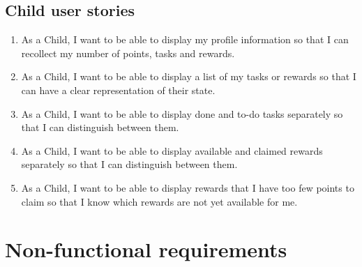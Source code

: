 \subsection{Child user stories}\label{subsec:requirements:functional:parent}
\begin{enumerate}[label=FR \arabic*.,leftmargin=3\parindent, start=27]
\item\label{fr:child:profile} As a Child, I want to be able to display my profile information so that I can recollect my number of points, tasks and rewards.
\item\label{fr:child:tasksrewards-list} As a Child, I want to be able to display a list of my tasks or rewards so that I can have a clear representation of their state.
\item\label{fr:child:tasks-tododone} As a Child, I want to be able to display done and to-do tasks separately so that I can distinguish between them.
\item\label{fr:child:rewards-availabeclaimed} As a Child, I want to be able to display available and claimed rewards separately so that I can distinguish between them.
\item\label{fr:child:rewards-unavailable} As a Child, I want to be able to display rewards that I have too few points to claim so that I know which rewards are not yet available for me.
\end{enumerate}


\section{Non-functional requirements}\label{sec:requirements:functional}



